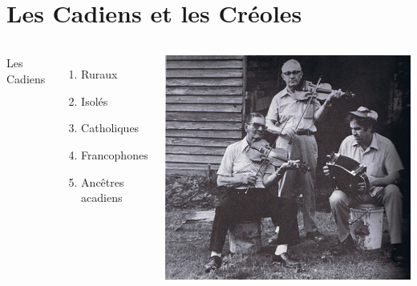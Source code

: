 \documentclass{beamer}
\begin{document}
  \section{Les Cadiens et les Créoles}
    \begin{frame}{}
      \begin{columns}
            Les Cadiens
            \begin{enumerate}
              \item Ruraux
              \item Isolés
              \item Catholiques
              \item Francophones
              \item Ancêtres acadiens
            \end{enumerate}
            \href{https://youtu.be/hkophR-j0SU}{
              \includegraphics[scale=0.17]{dennis_mcgee.jpg}
            }
      \end{columns}
    \end{frame}
\end{document}
